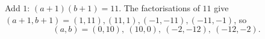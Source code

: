 Add $1$: $(a+1)(b+1)=11$. The factorisations of $11$ give $(a+1,b+1)=(1,11),(11,1),(-1,-11),(-11,-1)$, so
\[(a,b)=\boxed{(0,10),\ (10,0),\ (-2,-12),\ (-12,-2)}.\]
